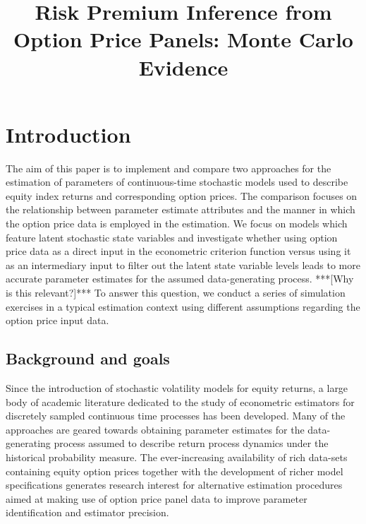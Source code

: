 \documentclass[11pt,a4paper,notitlepage]{article}
\author{ %
	    }
\title{Risk Premium Inference from Option Price Panels: Monte Carlo Evidence \vspace*{-25pt}}
\numberwithin{equation}{section}
\begin{document}
\maketitle

\onehalfspacing


\section{Introduction}
The aim of this paper is to implement and compare two approaches for the estimation of parameters of continuous-time stochastic models used to describe equity index returns and corresponding option prices. The comparison focuses on the relationship between parameter estimate attributes and the manner in which the option price data is employed in the estimation. We focus on models which feature latent stochastic state variables and investigate whether using option price data as a direct input in the econometric criterion function versus using it as an intermediary input to filter out the latent state variable levels leads to more accurate parameter estimates for the assumed data-generating process. ***[Why is this relevant?]*** To answer this question, we conduct a series of simulation exercises in a typical estimation context using different assumptions regarding the option price input data.

\subsection{Background and goals}
Since the introduction of stochastic volatility models for equity returns, a large body of academic literature dedicated to the study of econometric estimators for discretely sampled continuous time processes has been developed. Many of the approaches are geared towards obtaining parameter estimates for the data-generating process assumed to describe return process dynamics under the historical probability measure. The ever-increasing availability of rich data-sets containing equity option prices together with the development of richer model specifications generates research interest for alternative estimation procedures aimed at making use of option price panel data to improve parameter identification and estimator precision. 
\end{document}
